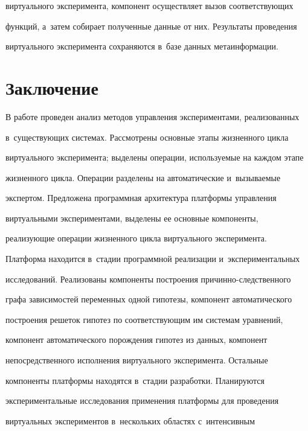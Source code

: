 виртуального эксперимента, компонент осуществляет вызов соответствующих 


функций, а~затем собирает полученные данные от них. Результаты проведения 


виртуального эксперимента сохраняются в~базе данных метаинформации.





\section{Заключение}





В работе проведен анализ методов управления экспериментами, реализованных 


в~существующих системах. Рассмотрены основные этапы жизненного цикла 


виртуального эксперимента; выделены операции, используемые на каждом этапе 


жизненного цикла. Операции разделены на автоматические и~вызываемые 


экспертом. Предложена программная архитектура платформы управления 


виртуальными экспериментами, выделены ее основные компоненты, 


реализующие операции жизненного цикла виртуального эксперимента. 





Платформа находится в~стадии программной реализации и~экспериментальных 


исследований. Реализованы компоненты построения при\-чин\-но-след\-ст\-вен\-но\-го 


графа зависимостей переменных одной гипотезы, компонент автоматического 


построения решеток гипотез по соответствующим им системам уравнений, 


компонент автоматического порождения гипотез из данных, компонент 


непосредственного исполнения виртуального эксперимента. Остальные 


компоненты платформы находятся в~стадии разработки. Планируются 


экспериментальные исследования применения платформы для проведения 


виртуальных экспериментов в~нескольких областях с~интенсивным 


